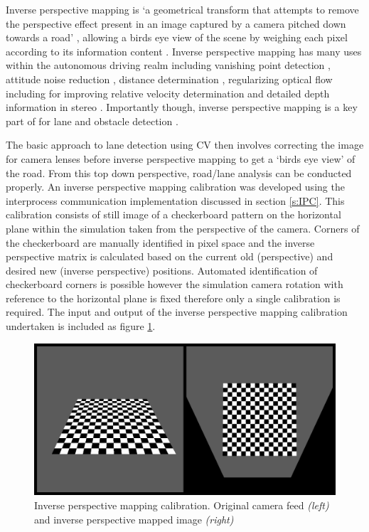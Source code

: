 \documentclass[]{aiaa-tc}%
\begin{document}
Inverse perspective mapping is `a geometrical transform that attempts to remove the perspective effect present in an image captured by a camera pitched down towards a road' \citep{intersectionDetectionSingleCamera}, allowing a birds eye view of the scene by weighing each pixel according to its information content \citep{stereoIPM}. Inverse perspective mapping has many uses within the autonomous driving realm including vanishing point detection  \citep{ipmVanishingPoint}, attitude noise reduction \citep{ipmAttitudeNoise}, distance determination \citep{ipmDistanceDetermination}, regularizing optical flow \citep{ipmOpticalFlow} including for improving relative velocity determination \citep{ipmOpticalFlowSpeed} and detailed depth information in stereo \citep{stereoIPM}. Importantly though, inverse perspective mapping is a key part of for lane and obstacle detection \citep{ipmOpticalFlow} \citep{ipmDistanceDetermination} \citep{ipmBasedLaneDetectionApproach} \citep{ipmVanishingPoint}.

The basic approach to lane detection using CV then involves correcting the image for camera lenses before inverse perspective mapping to get a `birds eye view' of the road. From this top down perspective, road/lane analysis can be conducted properly. An inverse perspective mapping calibration was developed using the interprocess communication implementation discussed in section \ref{s:IPC}. This calibration consists of still image of a checkerboard pattern on the horizontal plane within the simulation taken from the perspective of the camera. Corners of the checkerboard are manually identified in pixel space and the inverse perspective matrix is calculated based on the current old (perspective) and desired new (inverse perspective) positions. Automated identification of checkerboard corners is possible however the simulation camera rotation with reference to the horizontal plane is fixed therefore only a single calibration is required. The input and output of the inverse perspective mapping calibration undertaken is included as figure \ref{f:inverse_perspective_calibration}.

\begin{figure}[htb]%
	\includegraphics{InversePerspectiveEg.png}
	\caption{Inverse perspective mapping calibration. Original camera feed \textit{(left)} and inverse perspective mapped image \textit{(right)}}
	\label{f:inverse_perspective_calibration}
\end{figure}
\end{document}
